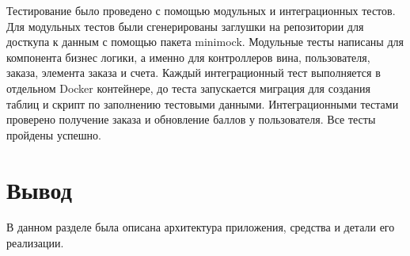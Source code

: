  Тестирование было проведено с помощью модульных и интеграционных тестов. Для модульных тестов были сгенерированы заглушки на репозитории для досткупа к данным с помощью пакета minimock\cite{minimock}. Модульные тесты написаны для компонента бизнес логики, а именно для контроллеров вина, пользователя, заказа, элемента заказа и счета.
 Каждый интеграционный тест выполняется в отдельном Docker\cite{docker} контейнере, до теста запускается миграция для создания таблиц и скрипт по заполнению тестовыми данными. Интеграционными тестами проверено получение заказа и обновление баллов у пользователя. Все тесты пройдены успешно.
 

\section*{Вывод}
 В данном разделе была описана архитектура приложения, средства и детали его реализации. 